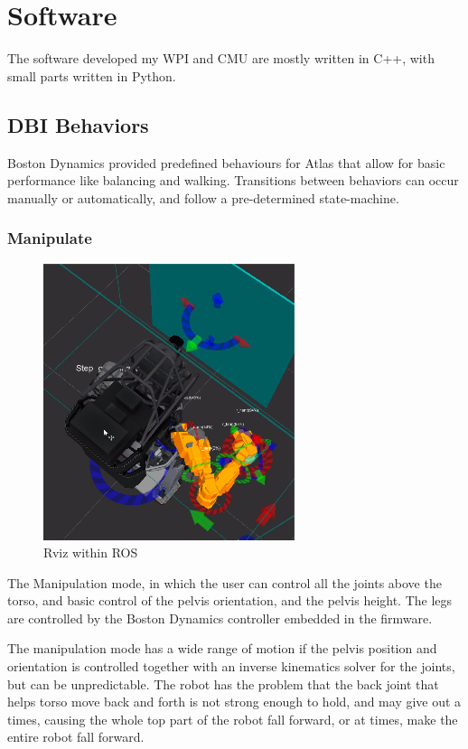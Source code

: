 \documentclass[12pt]{report}
\begin{document}
\section{Software}
The software developed my WPI and CMU are mostly written in C++, with small parts written in Python. 

\subsection{DBI Behaviors}
Boston Dynamics provided predefined behaviours for Atlas that allow for basic performance like balancing and walking. Transitions between behaviors can occur manually or automatically, and follow a pre-determined state-machine.

\subsubsection{Manipulate}
\begin{figure}
  \begin{center}
    \includegraphics[scale=0.5]{images/align_to_wall.png}
  \end{center}
  \caption{Rviz within ROS}
\end{figure}
The Manipulation mode, in which the user can control all the joints above the torso, and basic control of the pelvis orientation, and the pelvis height. The legs are controlled by the Boston Dynamics controller embedded in the firmware.

The manipulation mode has a wide range of motion if the pelvis position and orientation is controlled together with an inverse kinematics solver for the joints, but can be unpredictable. The robot has the problem that the back joint that helps torso move back and forth is not strong enough to hold, and may give out a times, causing the whole top part of the robot fall forward, or at times, make the entire robot fall forward. 
\end{document}

